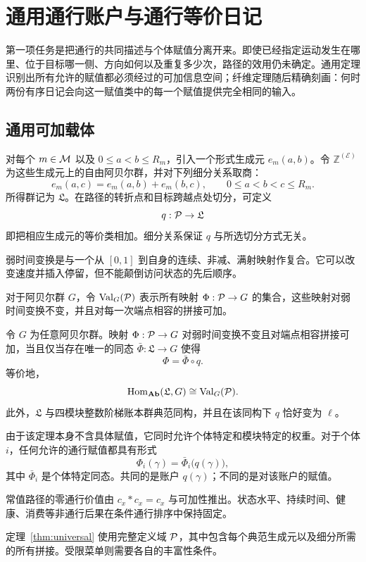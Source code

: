 \section{通用通行账户与通行等价日记}\label{sec:universal}

第一项任务是把通行的共同描述与个体赋值分离开来。即使已经指定运动发生在哪里、位于目标哪一侧、方向如何以及重复多少次，路径的效用仍未确定。通用定理识别出所有允许的赋值都必须经过的可加信息空间；纤维定理随后精确刻画：何时两份有序日记会向这一赋值类中的每一个赋值提供完全相同的输入。

\subsection{通用可加载体}

对每个 $m\in\mathcal M$ 以及 $0\le a<b\le R_m$，引入一个形式生成元 $e_m(a,b)$。令 $\mathbb Z^{(\mathcal E)}$ 为这些生成元上的自由阿贝尔群，并对下列细分关系取商：
\[
 e_m(a,c)=e_m(a,b)+e_m(b,c),
 \qquad 0\le a<b<c\le R_m.
\]
所得群记为 $\mathfrak L$。在路径的转折点和目标跨越点处切分，可定义
\[
 q:\mathcal P\to\mathfrak L
\]
即把相应生成元的等价类相加。细分关系保证 $q$ 与所选切分方式无关。

弱时间变换是与一个从 $[0,1]$ 到自身的连续、非减、满射映射作复合。它可以改变速度并插入停留，但不能颠倒访问状态的先后顺序。

对于阿贝尔群 $G$，令 $\operatorname{Val}_G(\mathcal P)$ 表示所有映射 $\Phi:\mathcal P\to G$ 的集合，这些映射对弱时间变换不变，并且对每一次端点相容的拼接可加。

\begin{theorem}[可加赋值的通用通行账户]\label{thm:universal}
令 $G$ 为任意阿贝尔群。映射 $\Phi:\mathcal P\to G$ 对弱时间变换不变且对端点相容拼接可加，当且仅当存在唯一的同态 $\bar\Phi:\mathfrak L\to G$ 使得
\[
 \Phi=\bar\Phi\circ q.
\]
等价地，
\[
 \operatorname{Hom}_{\mathbf{Ab}}(\mathfrak L,G)
 \cong
 \operatorname{Val}_G(\mathcal P).
\]
此外，$\mathfrak L$ 与四模块整数阶梯账本群典范同构，并且在该同构下 $q$ 恰好变为 $\ell$。
\end{theorem}

由于该定理本身不含具体赋值，它同时允许个体特定和模块特定的权重。对于个体 $i$，任何允许的通行赋值都具有形式
\[
 \Phi_i(\gamma)=\bar\Phi_i\bigl(q(\gamma)\bigr),
\]
其中 $\bar\Phi_i$ 是个体特定同态。共同的是账户 $q(\gamma)$；不同的是对该账户的赋值。

常值路径的零通行价值由 $c_x*c_x=c_x$ 与可加性推出。状态水平、持续时间、健康、消费等非通行后果在条件通行排序中保持固定。

定理~\ref{thm:universal} 使用完整定义域 $\mathcal P$，其中包含每个典范生成元以及细分所需的所有拼接。受限菜单则需要各自的丰富性条件。

